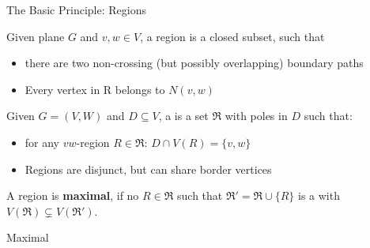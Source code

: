 \begin{frame}[c]{The Basic Principle: Regions}

    \begin{tcolorbox}[colback=TUMBlueLighter,title=Region (Simplified)]
        Given plane $G$ and $v,w \in V$, a region is a closed subset, such that
    \begin{itemize}
        \item there are two non-crossing (but possibly overlapping) boundary paths
        \item Every vertex in R belongs to $N(v,w)$
    \end{itemize}
    \end{tcolorbox}

    \begin{figure}[!ht]
    \end{figure}
\end{frame}

\begin{frame}[c]{\dreg}
    \begin{tcolorbox}[colback=TUMBlueLighter,title={\dreg\cite{Alber2004}}]
        Given $G = (V, W)$ and $D \subseteq V$, a \dreg is a set $\mathfrak{R}$ with poles in $D$ such that:
        \begin{itemize}
            \item for any $vw$-region $R \in \mathfrak{R}$: $D \cap V(R) = \{v, w\}$
            \item Regions are disjunct, but can share border vertices
        \end{itemize}
    \end{tcolorbox}
    A region is \textbf{maximal}, if no $R \in \mathfrak{R}$ such that $\mathfrak{R}' = \mathfrak{R} \cup \{R\}$ is a \dreg with $V(\mathfrak{R})\subsetneq V(\mathfrak{R}')$.
\end{frame}

\begin{frame}[c]{Maximal \dreg}
    \begin{figure}[!ht]
    \end{figure}
\end{frame}

